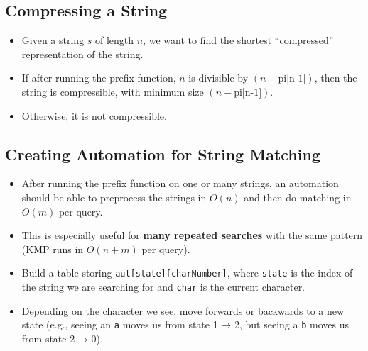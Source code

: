 {\subsection*{\small{Compressing a String}}
\begin{itemize}
    \item Given a string $s$ of length $n$, we want to find the shortest ``compressed'' representation of the string.
    \item If after running the prefix function, $n$ is divisible by $(n - \text{pi[n-1]})$, then the string is compressible, with minimum size $(n - \text{pi[n-1]})$.
    \item Otherwise, it is not compressible.
\end{itemize}

\subsection*{\small{Creating Automation for String Matching}}
\begin{itemize}
    \item After running the prefix function on one or many strings, an automation should be able to preprocess the strings in $O(n)$ and then do matching in $O(m)$ per query.
    \item This is especially useful for \textbf{many repeated searches} with the same pattern (KMP runs in $O(n+m)$ per query).
    \item Build a table storing \texttt{aut[state][charNumber]}, where \texttt{state} is the index of the string we are searching for and \texttt{char} is the current character.
    \item Depending on the character we see, move forwards or backwards to a new state (e.g., seeing an \texttt{a} moves us from state 1 → 2, but seeing a \texttt{b} moves us from state 2 → 0).
\end{itemize}
}


